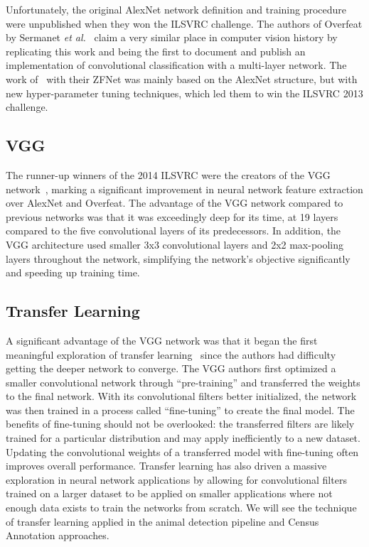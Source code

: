 Unfortunately, the original AlexNet network definition and training procedure were unpublished when they won the ILSVRC challenge.  The authors of Overfeat by Sermanet \textit{et al.}~\cite{sermanet_overfeat:_2013} claim a very similar place in computer vision history by replicating this work and being the first to document and publish an implementation of convolutional classification with a multi-layer network.  The work of~\cite{zeiler_visualizing_2014} with their ZFNet was mainly based on the AlexNet structure, but with new hyper-parameter tuning techniques, which led them to win the ILSVRC 2013 challenge.

\subsection{VGG}

The runner-up winners of the 2014 ILSVRC were the creators of the VGG network~\cite{simonyan_very_2014}, marking a significant improvement in neural network feature extraction over AlexNet and Overfeat.  The advantage of the VGG network compared to previous networks was that it was exceedingly deep for its time, at 19 layers compared to the five convolutional layers of its predecessors. In addition, the VGG architecture used smaller 3x3 convolutional layers and 2x2 max-pooling layers throughout the network, simplifying the network's objective significantly and speeding up training time.

\subsection{Transfer Learning}

A significant advantage of the VGG network was that it began the first meaningful exploration of transfer learning~\cite{raina_self-taught_2007,oquab_learning_2014,yosinski_how_2014} since the authors had difficulty getting the deeper network to converge.  The VGG authors first optimized a smaller convolutional network through ``pre-training'' and transferred the weights to the final network.  With its convolutional filters better initialized, the network was then trained in a process called ``fine-tuning'' to create the final model.  The benefits of fine-tuning should not be overlooked: the transferred filters are likely trained for a particular distribution and may apply inefficiently to a new dataset.  Updating the convolutional weights of a transferred model with fine-tuning often improves overall performance.  Transfer learning has also driven a massive exploration in neural network applications by allowing for convolutional filters trained on a larger dataset to be applied on smaller applications where not enough data exists to train the networks from scratch.  We will see the technique of transfer learning applied in the animal detection pipeline and Census Annotation approaches.

